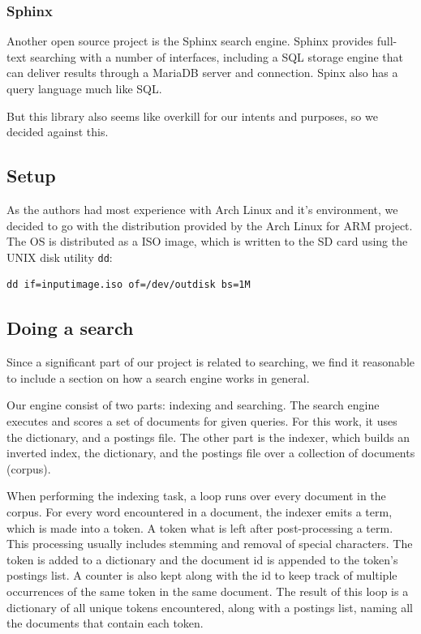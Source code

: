 \subsubsection{Sphinx}
Another open source project is the Sphinx search engine\cite{sphinx}. Sphinx provides full-text searching with a number of interfaces, including a SQL storage engine that can deliver results through a MariaDB server and connection. Spinx also has a query language much like SQL.

But this library also seems like overkill for our intents and purposes, so we decided against this.

\subsection{Setup}
As the authors had most experience with Arch Linux and it's environment, we decided to go with the distribution provided by the Arch Linux for ARM project.
The OS is distributed as a ISO image, which is written to the SD card using the UNIX disk utility {\tt dd}:
\begin{lstlisting}
dd if=inputimage.iso of=/dev/outdisk bs=1M
\end{lstlisting}

\subsection{Doing a search}
Since a significant part of our project is related to searching, we find it reasonable to include a section on how a search engine works in general.

Our engine consist of two parts: indexing and searching.
The search engine executes and scores a set of documents for given queries. For this work, it uses the dictionary, and a postings file.
The other part is the indexer, which builds an inverted index, the dictionary, and the postings file\cite{IntroIR} over a collection of documents (corpus).

When performing the indexing task, a loop runs over every document in the corpus.
For every word encountered in a document, the indexer emits a term, which is made into a token.
A token what is left after post-processing a term. This processing usually includes stemming and removal of special characters.
The token is added to a dictionary and the document id is appended to the token's postings list. A counter is also kept along with the id to keep track of multiple occurrences of the same token in the same document.
The result of this loop is a dictionary of all unique tokens encountered, along with a postings list, naming all the documents that contain each token.

